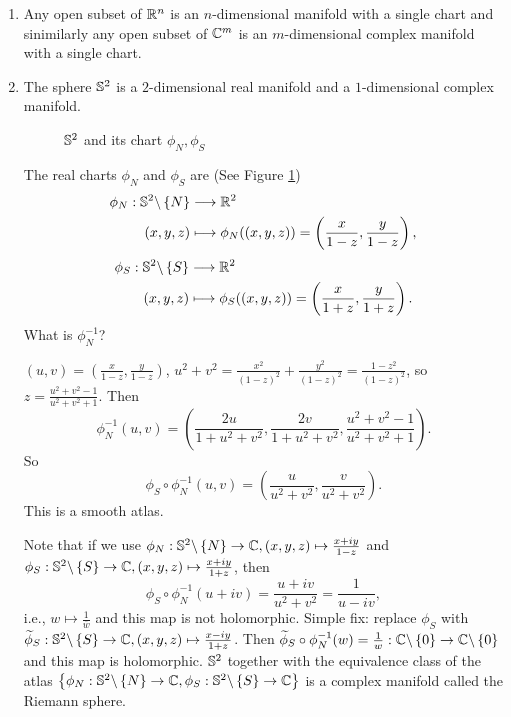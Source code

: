 \begin{example}
  \begin{enumerate}
    \item Any open subset of $\mathbb{R}^{n}$ is an $n$-dimensional manifold with a single chart and sinimilarly any open subset of $\mathbb{C}^{m}$ is an  $m$-dimensional complex manifold with a single chart.
    \item The sphere $\mathbb{S}^2$ is a $2$-dimensional real manifold and a $1$-dimensional complex manifold.

\begin{figure}[ht]
    \centering
    \caption{$\mathbb{S}^2$ and its chart $\phi_N,\phi_S$ }
    \label{fig:sphere}
\end{figure}
The real charts $\phi_N$ and $\phi_S$ are (See Figure \ref{fig:sphere})
      \begin{align*}
        \phi_N: \mathbb{S}^2 \backslash \left\{N\right\}  &\longrightarrow \mathbb{R}^2 \\
	(x,y,z) &\longmapsto \phi_N(	(x,y,z)) = \left( \frac{x}{1-z},\frac{y}{1-z} \right) 
      ,\end{align*}
      \begin{align*}
        \phi_S: \mathbb{S}^2 \backslash \left\{S\right\}  &\longrightarrow \mathbb{R}^2 \\
	(x,y,z) &\longmapsto \phi_S(	(x,y,z)) = \left( \frac{x}{1+z},\frac{y}{1+z} \right) 
      .\end{align*}
  What is $\phi_N^{-1}$?
  
  $(u,v)=\left( \frac{x}{1-z},\frac{y}{1-z} \right) $, $u^2+v^2=\frac{x^2}{(1-z)^2}+\frac{y^2}{(1-z)^2}=\frac{1-z^2}{(1-z)^2}$, so $z= \frac{u^2+v^2-1}{u^2+v^2+1}$. Then 
  \[
    \phi_{N}^{-1}(u,v)=\left( \frac{2u}{1+u^2+v^2}, \frac{2v}{1+u^2+v^2}, \frac{u^2+v^2-1}{u^2+v^2+1} \right) .
  \] 
  So 
  \[
    \phi_S\circ \phi_{N}^{-1}(u,v)=\left( \frac{u}{u^2+v^2},\frac{v}{u^2+v^2} \right) .
  \]
  This is a smooth atlas.

  Note that if we use $\phi_N:\mathbb{S}^2 \backslash  \left\{N\right\} \to \mathbb{C},(x,y,z)\mapsto \frac{x+iy}{1-z}$ and $\phi_S:\mathbb{S}^2\backslash \left\{S\right\} \to \mathbb{C},(x,y,z)\mapsto \frac{x+iy}{1+z}$, then
  \[
    \phi_S\circ \phi_N^{-1}(u+iv)= \frac{u+iv}{u^2+v^2}=\frac{1}{u-iv},
  \] 
  i.e., $w\mapsto \frac{1}{\overline{w} }$ and this map is not holomorphic. Simple fix: replace $\phi_S$ with $\widetilde{\phi}_S:\mathbb{S}^2 \backslash \left\{S\right\} \to \mathbb{C}, (x,y,z)\mapsto \frac{x-iy}{1+z}$. Then $\widetilde{\phi}_S\circ \phi^{-1}_N(w)=\frac{1}{w}:\mathbb{C} \backslash \left\{0\right\} \to \mathbb{C}\backslash \left\{0\right\} $ and this map is holomorphic. $\mathbb{S}^2$ together with the equivalence class of the atlas $\left\{\phi_N:\mathbb{S}^2\backslash \left\{N\right\} \to \mathbb{C},\phi_S:\mathbb{S}^2\backslash \left\{S\right\} \to \mathbb{C}\right\} $ is a complex manifold called the Riemann sphere.
\end{enumerate}
\end{example}

